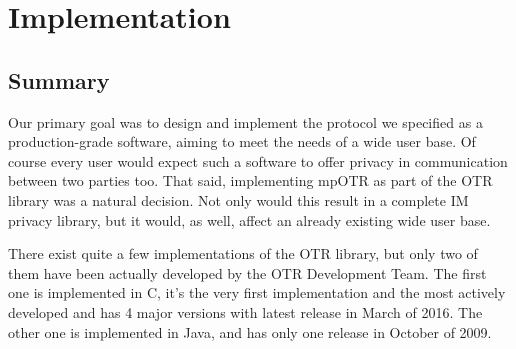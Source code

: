 \chapter{Implementation}
\label{chapter:implementation}


\section{Summary}

Our primary goal was to design and implement the protocol we specified as a production-grade software, aiming to meet the needs of a wide user base. Of course every user would expect such a software to offer privacy in communication between two parties too. That said, implementing mpOTR as part of the OTR library was a natural decision. Not only would this result in a complete IM privacy library, but it would, as well, affect an already existing wide user base.

There exist quite a few implementations of the OTR library, but only two of them have been actually developed by the OTR Development Team. The first one is implemented in C, it's the very first implementation and the most actively developed and has 4 major versions with latest release in March of 2016. The other one is implemented in Java, and has only one release in October of 2009. 

